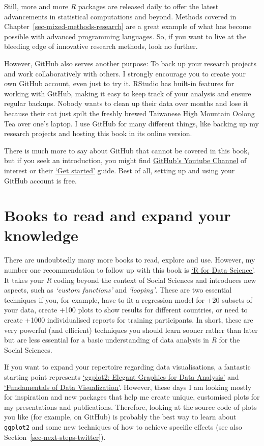 \documentclass[
  letterpaper,
  DIV=11,
  numbers=noendperiod]{scrreprt}
\begin{document}
Still, more and more \emph{R} packages are released daily to offer the
latest advancements in statistical computations and beyond. Methods
covered in Chapter~\ref{sec-mixed-methods-research} are a great example
of what has become possible with advanced programming languages. So, if
you want to live at the bleeding edge of innovative research methods,
look no further.

However, GitHub also serves another purpose: To back up your research
projects and work collaboratively with others. I strongly encourage you
to create your own GitHub account, even just to try it. RStudio has
built-in features for working with GitHub, making it easy to keep track
of your analysis and ensure regular backups. Nobody wants to clean up
their data over months and lose it because their cat just spilt the
freshly brewed Taiwanese High Mountain Oolong Tea over one's laptop. I
use GitHub for many different things, like backing up my research
projects and hosting this book in its online version.

There is much more to say about GitHub that cannot be covered in this
book, but if you seek an introduction, you might find
\href{https://www.youtube.com/user/github}{GitHub's Youtube Channel} of
interest or their \href{https://docs.github.com/en}{`Get started'}
guide. Best of all, setting up and using your GitHub account is free.

\section{Books to read and expand your
knowledge}\label{sec-next-steps-books}

There are undoubtedly many more books to read, explore and use. However,
my number one recommendation to follow up with this book is
\href{https://r4ds.had.co.nz}{`R for Data Science'}. It takes your
\emph{R} coding beyond the context of Social Sciences and introduces new
aspects, such as \emph{`custom functions'} and \emph{`looping'}. These
are two essential techniques if you, for example, have to fit a
regression model for +20 subsets of your data, create +100 plots to show
results for different countries, or need to create +1000 individualised
reports for training participants. In short, these are very powerful
(and efficient) techniques you should learn sooner rather than later but
are less essential for a basic understanding of data analysis in
\emph{R} for the Social Sciences.

If you want to expand your repertoire regarding data visualisations, a
fantastic starting point represents
\href{https://ggplot2-book.org}{`ggplot2: Elegant Graphics for Data
Analysis'} and \href{https://clauswilke.com/dataviz/}{`Fundamentals of
Data Visualization'}. However, these days I am looking mostly for
inspiration and new packages that help me create unique, customised
plots for my presentations and publications. Therefore, looking at the
source code of plots you like (for example, on GitHub) is probably the
best way to learn about \texttt{ggplot2} and some new techniques of how
to achieve specific effects (see also
Section~\ref{sec-next-steps-twitter}).
\end{document}
